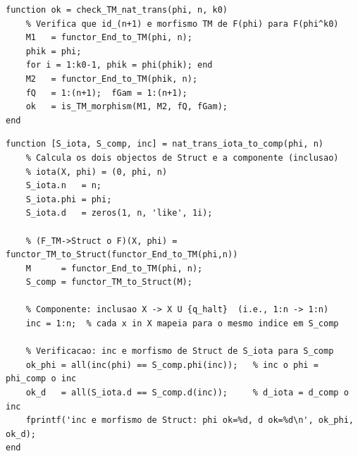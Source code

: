 \begin{lstlisting}[style=matlab, caption={Verificação da naturalidade $\eta^{(k_0)}: F \Rightarrow F^{(k_0)}$ em End $\to$ TM}]
function ok = check_TM_nat_trans(phi, n, k0)
    % Verifica que id_(n+1) e morfismo TM de F(phi) para F(phi^k0)
    M1   = functor_End_to_TM(phi, n);
    phik = phi;
    for i = 1:k0-1, phik = phi(phik); end
    M2   = functor_End_to_TM(phik, n);
    fQ   = 1:(n+1);  fGam = 1:(n+1);
    ok   = is_TM_morphism(M1, M2, fQ, fGam);
end
\end{lstlisting}

\begin{lstlisting}[style=matlab, caption={Componente da trans. natural $\iota \Rightarrow F_{\mathrm{TM}\to\mathrm{Struct}} \circ F$ em $(X,\varphi)$}]
function [S_iota, S_comp, inc] = nat_trans_iota_to_comp(phi, n)
    % Calcula os dois objectos de Struct e a componente (inclusao)
    % iota(X, phi) = (0, phi, n)
    S_iota.n   = n;
    S_iota.phi = phi;
    S_iota.d   = zeros(1, n, 'like', 1i);

    % (F_TM->Struct o F)(X, phi) = functor_TM_to_Struct(functor_End_to_TM(phi,n))
    M      = functor_End_to_TM(phi, n);
    S_comp = functor_TM_to_Struct(M);

    % Componente: inclusao X -> X U {q_halt}  (i.e., 1:n -> 1:n)
    inc = 1:n;  % cada x in X mapeia para o mesmo indice em S_comp

    % Verificacao: inc e morfismo de Struct de S_iota para S_comp
    ok_phi = all(inc(phi) == S_comp.phi(inc));   % inc o phi = phi_comp o inc
    ok_d   = all(S_iota.d == S_comp.d(inc));     % d_iota = d_comp o inc
    fprintf('inc e morfismo de Struct: phi ok=%d, d ok=%d\n', ok_phi, ok_d);
end
\end{lstlisting}